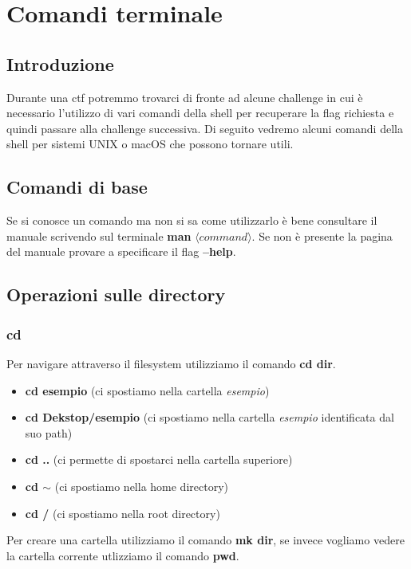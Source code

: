 \documentclass[oneside,a4paper,11pt]{book}
\theoremstyle{italicstyle}
\theoremstyle{normStyle}
\begin{document}
\chapter{Comandi terminale}
\section{Introduzione}
Durante una ctf potremmo trovarci di fronte ad alcune challenge in cui è necessario l'utilizzo di vari comandi della shell per recuperare la flag richiesta e quindi passare alla challenge successiva.
Di seguito vedremo alcuni comandi della shell per sistemi UNIX o macOS che possono tornare utili.

\section{Comandi di base}
Se si conosce un comando ma non si sa come utilizzarlo è bene consultare il manuale scrivendo sul terminale \textbf{man} $\langle command \rangle$. Se non è presente la pagina del manuale provare a specificare il flag \textbf{--help}. 

\section{Operazioni sulle directory}
\subsection{cd}
Per navigare attraverso il filesystem utilizziamo il comando \textbf{cd dir}.
\begin{itemize}
    \item \textbf{cd esempio} (ci spostiamo nella cartella \textit{esempio})
    \item \textbf{cd Dekstop/esempio} (ci spostiamo nella cartella \textit{esempio} identificata dal suo path)
    \item \textbf{cd ..} (ci permette di spostarci nella cartella superiore)
    \item \textbf{cd $\sim$} (ci spostiamo nella home directory)
    \item \textbf{cd /} (ci spostiamo nella root directory)
\end{itemize}
Per creare una cartella utilizziamo il comando \textbf{mk dir}, se invece vogliamo vedere la cartella corrente utlizziamo il comando \textbf{pwd}.
\end{document}
